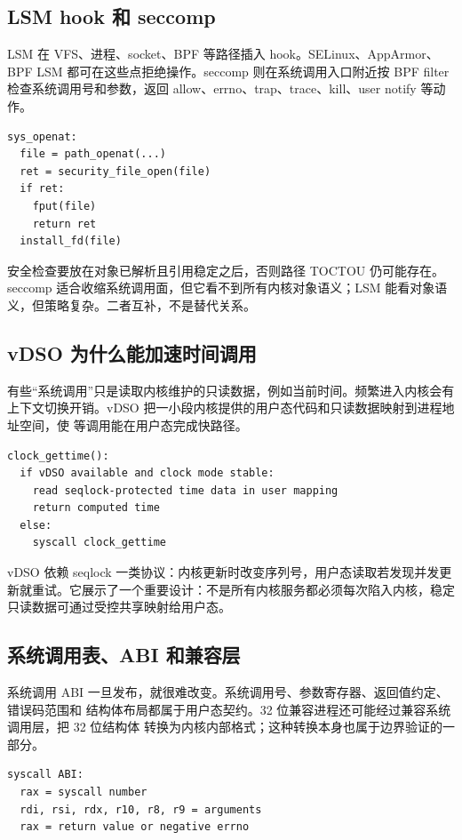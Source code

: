 \subsection{LSM hook 和 seccomp}

LSM 在 VFS、进程、socket、BPF 等路径插入  hook。SELinux、AppArmor、BPF LSM 都可在这些点拒绝操作。seccomp 则在系统调用入口附近按 BPF filter 检查系统调用号和参数，返回 allow、errno、trap、trace、kill、user notify 等动作。

\begin{lstlisting}
sys_openat:
  file = path_openat(...)
  ret = security_file_open(file)
  if ret:
    fput(file)
    return ret
  install_fd(file)
\end{lstlisting}

安全检查要放在对象已解析且引用稳定之后，否则路径 TOCTOU 仍可能存在。seccomp 适合收缩系统调用面，但它看不到所有内核对象语义；LSM 能看对象语义，但策略复杂。二者互补，不是替代关系。

\subsection{vDSO 为什么能加速时间调用}

有些“系统调用”只是读取内核维护的只读数据，例如当前时间。频繁进入内核会有上下文切换开销。vDSO 把一小段内核提供的用户态代码和只读数据映射到进程地址空间，使  等调用能在用户态完成快路径。

\begin{lstlisting}
clock_gettime():
  if vDSO available and clock mode stable:
    read seqlock-protected time data in user mapping
    return computed time
  else:
    syscall clock_gettime
\end{lstlisting}

vDSO 依赖 seqlock 一类协议：内核更新时改变序列号，用户态读取若发现并发更新就重试。它展示了一个重要设计：不是所有内核服务都必须每次陷入内核，稳定只读数据可通过受控共享映射给用户态。

\subsection{系统调用表、ABI 和兼容层}

系统调用 ABI 一旦发布，就很难改变。系统调用号、参数寄存器、返回值约定、错误码范围和
结构体布局都属于用户态契约。32 位兼容进程还可能经过兼容系统调用层，把 32 位结构体
转换为内核内部格式；这种转换本身也属于边界验证的一部分。

\begin{lstlisting}
syscall ABI:
  rax = syscall number
  rdi, rsi, rdx, r10, r8, r9 = arguments
  rax = return value or negative errno
\end{lstlisting}

